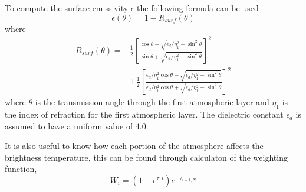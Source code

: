 To compute the surface emissivity $\epsilon$ the following formula can be used
\begin{equation}\label{eq:rtm-esurf}
\epsilon(\theta) = 1-R_{surf}(\theta)
\end{equation}
where
\begin{equation}\label{eq:rtm-rsurf}
\begin{split}
R_{surf}(\theta) =& \frac{1}{2} \left[ \frac{\cos\theta - \sqrt{\epsilon_d/\eta_1^2-\sin^2\theta}}{\sin\theta + \sqrt{\epsilon_d/\eta_1^2-\sin^2\theta}} \right]^2\\
&+\frac{1}{2} \left[ \frac{\epsilon_d/\eta_1^2 \cos\theta - \sqrt{\epsilon_d/\eta_1^2-\sin^2\theta}}{\epsilon_d/\eta_1^2 \cos\theta + \sqrt{\epsilon_d/\eta_1^2-\sin^2\theta}} \right]^2
\end{split}
\end{equation}
where $\theta$ is the transmission angle through the first atmospheric layer and $\eta_1$ is the index of refraction for the first atmospheric layer. The dielectric constant $\epsilon_d$ is assumed to have a uniform value of $4.0$.

It is also useful to know how each portion of the atmosphere affects the brightness temperature, this can be found through calculaton of the weighting function,
\begin{equation}
W_i = (1-e^{\tau,i}) e^{-\tau_{i+1,N}}
\end{equation}









